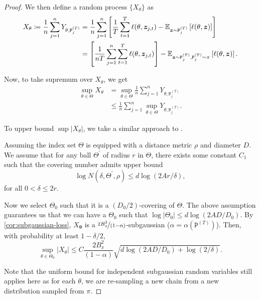 \begin{proof}
    

We then define a random process 
$\{ X_\theta \}$ as
\begin{align*}
X_{\theta}
\coloneqq
\frac{1}{n}
\sum^n_{j=1}
Y_{\theta, \mathtt{P}_j^{(T)}}
&=
\frac{1}{n}
\sum^n_{j=1}
\left[
\frac{1}{T}
\sum_{t=1}^T
\ell( \theta, \bm{z}_{j,t})
-
\mathbb{E}_{\bm{z} \sim \mathtt{P}^{(T)}_j}
\left[
\ell( \theta, \bm{z})
\right]
\right]
\\
&=
\left[
\frac{1}{nT}
\sum^n_{j=1}
\sum_{t=1}^T
\ell( \theta, \bm{z}_{j,t})
\right]
-
\mathbb{E}_{\bm{z} \sim \mathtt{P}^{(T)}_j, \mathtt{P}^{(T)}_j \sim \pi}
\left[
\ell( \theta, \bm{z})
\right].
\end{align*}

Now, to take supremum over $X_\theta$, we get
\begin{align*}
    \sup_{\theta \in \Theta}
    X_\theta
    &=
    \sup_{\theta \in \Theta}
    \frac{1}{n}
    \sum_{j=1}^n
    Y_{\theta, \mathtt{P}_j^{(T)}}
    \\
    &\leq
    \frac{1}{n}
    \sum_{j=1}^n
    \sup_{\theta \in \Theta}
    Y_{\theta, \mathtt{P}_j^{(T)}}.
\end{align*}

To upper bound $\sup | X_{\theta} |$,   we take a similar approach to \citep[Proposition~A.4]{bai2024transformers}.

Assuming the index set $\Theta$ is equipped with a distance metric $\rho$ and diameter $D$.
We assume that for any ball $\Theta^\prime$ of radius $r$ in $\Theta$, there exists some constant $C_1$ such that the covering number admits upper bound
\[
\log
N( \delta, \Theta^\prime, \rho)
\leq
d \log ( 2 A r / \delta),
\]
for all $0 < \delta \leq 2r$.

Now we select $\Theta_0$ such that it is a $(D_0/2)$-covering of $\Theta$.
The above assumption guarantees us that we can have a $\Theta_0$ such that $\log | \Theta_0 | \leq d \log (2AD/D_0)$.
By \cref{cor:subgaussian-loss}, $X_{\bm{\theta}}$ is a $\nicefrac{2 B_x^2}{(1 - \alpha)}$-subgaussian ($\alpha = \alpha( \mathtt{P}^{(T)})$).
Then, with probability at least $1 - \delta/2$, 
\[
\sup_{\theta \in \Theta_0}
| X_\theta |
\leq
C \frac{2 B_x^2}{(1 - \alpha)}
\sqrt{
d \log (2 A D/ D_0)
+
\log ( 2 / \delta)
}.
\]

Note that the uniform bound for independent subgaussian random variables still applies here as for each $\theta$, we are re-sampling a new chain from a new distribution sampled from $\pi$.


\end{proof}
